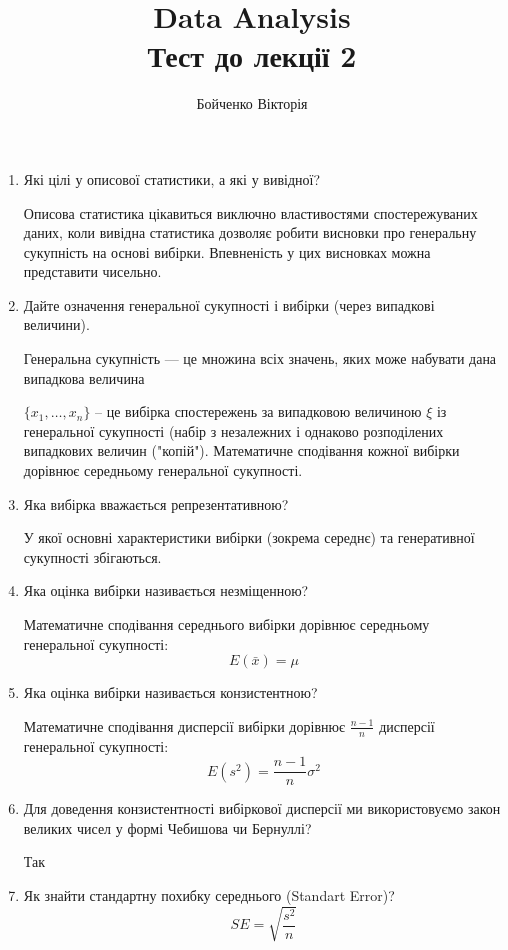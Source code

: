 \documentclass[12pt]{extarticle}
\title{Data Analysis \\  Тест до лекції 2}
\author{Бойченко Вікторія}
\date{}
\begin{document}
\maketitle

\begin{enumerate}

\item Які цілі у описової статистики, а які у вивідної?

Описова статистика цікавиться виключно властивостями спостережуваних даних, коли вивідна статистика дозволяє робити висновки про генеральну сукупність на основі вибірки. Впевненість у цих висновках можна представити чисельно.

\item  Дайте означення генеральної сукупності і вибірки (через випадкові величини).

Генеральна сукупність — це множина всіх значень, яких
може набувати дана випадкова величина

$\{x_1, \ldots , x_n\}$ – це вибірка спостережень за випадковою
величиною $\xi$ із генеральної сукупності (набір з
незалежних і однаково розподілених випадкових величин ("копій"). Математичне сподівання кожної вибірки дорівнює середньому генеральної сукупності.

\item  Яка вибірка вважається репрезентативною?

У якої основні характеристики вибірки (зокрема середнє) та генеративної сукупності збігаються. 

\item  Яка оцінка вибірки називається незміщенною? 

Математичне сподівання середнього вибірки дорівнює середньому генеральної сукупності: \[E(\bar{x})= \mu\] 

\item  Яка оцінка вибірки називається конзистентною?

Математичне сподівання дисперсії вибірки дорівнює $\frac{n-1}{n}$ дисперсії генеральної сукупності: \[E(s^2) = \frac{n-1}{n} \sigma^2\] 

\item  Для доведення конзистентності вибіркової дисперсії ми використовуємо закон великих чисел у формі Чебишова чи Бернуллі?

Так

\item  Як знайти стандартну похибку середнього (Standart Error)?
\[SE=\sqrt{\frac{s^2}{n}}\]


\end{enumerate}
\end{document}
